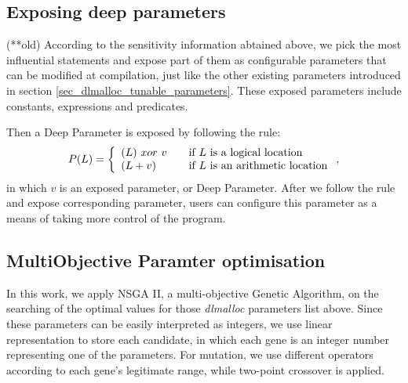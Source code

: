 %
%
%
%
\subsection{Exposing deep parameters}


(**old)
According to the sensitivity information abtained above, we pick the most influential statements and expose part of them as configurable parameters that can be modified at compilation, just like the other existing parameters introduced in section \ref{sec_dlmalloc_tunable_parameters}. These exposed parameters include constants, expressions and predicates. 

Then a Deep Parameter is exposed by following the rule:
\begin{equation}
 P(L) = \left\{
  \begin{array}{l l}
    (L) \ xor \ v & \quad \text{if $L$ is a logical location}\\
    (L + v) & \quad \text{if $L$ is an arithmetic location}
  \end{array} \right.,
\end{equation}
in which $v$ is an exposed parameter, or Deep Parameter. After we follow the rule and expose corresponding parameter, users can configure this parameter as a means of taking more control of the program.



\subsection{MultiObjective Paramter optimisation}
\label{sec_nsgaii}
In this work, we apply NSGA II\cite{996017}, a multi-objective Genetic Algorithm, on the searching of the optimal values for those \emph{dlmalloc} parameters list above.
Since these parameters can be easily interpreted as integers, we use linear representation to store each candidate, in which each gene is an integer number representing one of the parameters. For mutation, we use different operators according to each gene's legitimate range, while two-point crossover is applied.

